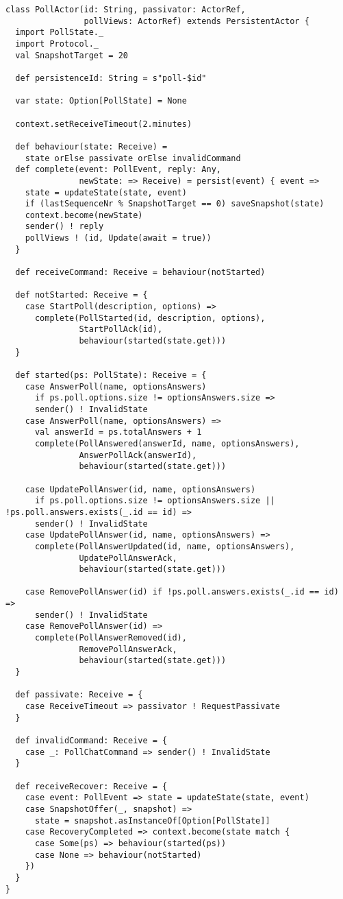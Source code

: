 \begin{lstlisting}[style=listing, caption={Персистентен актьор за анкета}]
class PollActor(id: String, passivator: ActorRef,
                pollViews: ActorRef) extends PersistentActor {
  import PollState._
  import Protocol._
  val SnapshotTarget = 20
  
  def persistenceId: String = s"poll-$id"
  
  var state: Option[PollState] = None
  
  context.setReceiveTimeout(2.minutes)
  
  def behaviour(state: Receive) =
    state orElse passivate orElse invalidCommand
  def complete(event: PollEvent, reply: Any,
               newState: => Receive) = persist(event) { event =>
    state = updateState(state, event)
    if (lastSequenceNr % SnapshotTarget == 0) saveSnapshot(state)
    context.become(newState)
    sender() ! reply
    pollViews ! (id, Update(await = true))
  }
  
  def receiveCommand: Receive = behaviour(notStarted)
  
  def notStarted: Receive = {
    case StartPoll(description, options) =>
      complete(PollStarted(id, description, options),
               StartPollAck(id),
               behaviour(started(state.get)))
  }
  
  def started(ps: PollState): Receive = {
    case AnswerPoll(name, optionsAnswers)
      if ps.poll.options.size != optionsAnswers.size =>
      sender() ! InvalidState
    case AnswerPoll(name, optionsAnswers) =>
      val answerId = ps.totalAnswers + 1
      complete(PollAnswered(answerId, name, optionsAnswers),
               AnswerPollAck(answerId),
               behaviour(started(state.get)))
    
    case UpdatePollAnswer(id, name, optionsAnswers)
      if ps.poll.options.size != optionsAnswers.size || !ps.poll.answers.exists(_.id == id) =>
      sender() ! InvalidState
    case UpdatePollAnswer(id, name, optionsAnswers) =>
      complete(PollAnswerUpdated(id, name, optionsAnswers),
               UpdatePollAnswerAck,
               behaviour(started(state.get)))
    
    case RemovePollAnswer(id) if !ps.poll.answers.exists(_.id == id) =>
      sender() ! InvalidState
    case RemovePollAnswer(id) =>
      complete(PollAnswerRemoved(id),
               RemovePollAnswerAck,
               behaviour(started(state.get)))
  }
  
  def passivate: Receive = {
    case ReceiveTimeout => passivator ! RequestPassivate
  }
  
  def invalidCommand: Receive = {
    case _: PollChatCommand => sender() ! InvalidState
  }
  
  def receiveRecover: Receive = {
    case event: PollEvent => state = updateState(state, event)
    case SnapshotOffer(_, snapshot) =>
      state = snapshot.asInstanceOf[Option[PollState]]
    case RecoveryCompleted => context.become(state match {
      case Some(ps) => behaviour(started(ps))
      case None => behaviour(notStarted)
    })
  }
}
\end{lstlisting}

